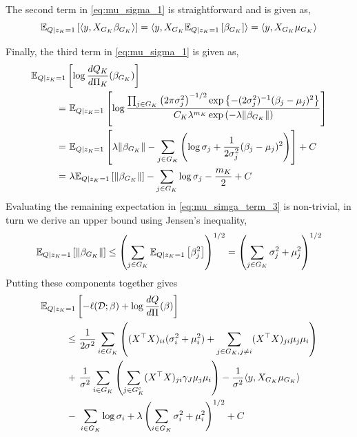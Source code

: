\documentclass[12pt]{article}
\begin{document}
The second term in \eqref{eq:mu_sigma_1} is straightforward and is given as,
\begin{equation} \label{eq:mu_sigma_term_2}
    \mathbb{E}_{Q | z_K = 1} \left[ \langle y, X_{G_K} \beta_{G_K} \rangle  \right]
=   
    \langle y, X_{G_K} \mathbb{E}_{Q | z_K = 1} \left[ \beta_{G_K} \right] \rangle   
=
    \langle y, X_{G_K} \mu_{G_K} \rangle  
\end{equation}

Finally, the third term in \eqref{eq:mu_sigma_1} is given as,
\begin{align}
    \mathbb{E}_{Q | z_K = 1 } & \left[ \log \frac{dQ_K}{d\Pi_K} (\beta_{G_K}) \right]
    \nonumber \\
= &\
    \mathbb{E}_{Q | z_K = 1 } \left[ 
	\log \frac
	{\prod_{j \in G_K} \left( 2 \pi \sigma_j^2 \right)^{-1/2} \exp \left\{ -(2\sigma^2_{j})^{-1}(\beta_{j} - \mu_j )^2 \right\}}
	{C_K \lambda^{m_K} \exp\left( - \lambda \| \beta_{G_K} \| \right)}
    \right] \nonumber \\
= &\
    \mathbb{E}_{Q | z_K = 1 } \left[ 
	\lambda \| \beta_{G_K} \|
	- \sum_{j \in G_K} \left( 
	    \log{\sigma_j} 
	    + \frac{1}{2\sigma_j^2} (\beta_{j} - \mu_j)^2
	\right)
    \right] + C \nonumber \\
= &\
    \lambda \mathbb{E}_{Q | z_K = 1 } \left[ 
	\| \beta_{G_K} \|
    \right] 
    - \sum_{j \in G_K} \log{\sigma_j} 
    - \frac{m_K}{2} 
    + C 
    \label{eq:mu_simga_term_3}
\end{align}
Evaluating the remaining expectation in \eqref{eq:mu_simga_term_3} is non-trivial, in turn we derive an upper bound using Jensen's inequality,
\begin{equation} \label{eq:mu_sigma_upper}
    \mathbb{E}_{Q | z_K = 1 } \left[ 
	\| \beta_{G_K} \|
    \right] 
\leq
    \left( \sum_{j \in G_K} 
	\mathbb{E}_{Q | z_K = 1 } \left[ \beta_{j}^2 \right] 
    \right)^{1/2} 
=
    \left( \sum_{j \in G_K} 
	\sigma_j^2 + \mu_j^2
    \right)^{1/2} 
\end{equation}
Putting these components together gives
\begin{equation} \label{eq:mu_sigma_main}
\begin{aligned}
    \mathbb{E}_{Q  | z_K = 1} & \left[ 
	- \ell(\mathcal{D}; \beta) + \log \frac{dQ}{d\Pi}(\beta) 
    \right]  \\
\leq &\
    \frac{1}{2\sigma^2} 
    \sum_{i \in G_K} \left( 
	    (X^\top X)_{ii} (\sigma_i^2 + \mu_i^2)
	+
	\sum_{j \in G_K, j\neq i} 
	    (X^\top X)_{ji} \mu_j \mu_i
    \right ) \\
+ &\
    \frac{1}{\sigma^2} 
    \sum_{i \in G_K} \left( 
    \sum_{j \in G_K^c} (X^\top X)_{ji} 
	\gamma_{J} \mu_j \mu_i
    \right )
-
    \frac{1}{\sigma^2}
    \langle y, X_{G_K} \mu_{G_K} \rangle   \\
- &\
    \sum_{i \in G_K} \log{\sigma_i}
+
    \lambda \left( \sum_{i \in G_K} 
	\sigma_i^2 + \mu_i^2
    \right)^{1/2} + C
\end{aligned}
\end{equation}
\end{document}
